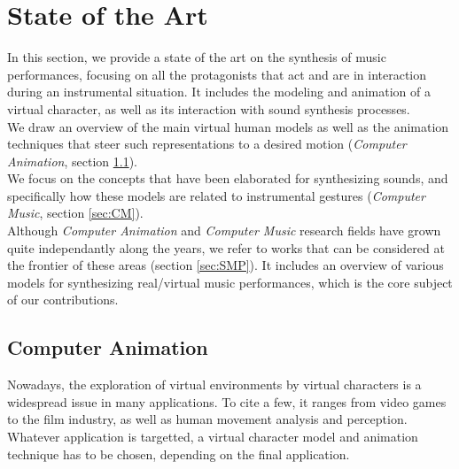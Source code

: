 \chapter{State of the Art}
\label{chapter:StateOfTheArt}



In this section, we provide a state of the art on the synthesis of music performances, focusing on all the protagonists that act and are in interaction during an instrumental situation. It includes the modeling and animation of a virtual character, as well as its interaction with sound synthesis processes.\\

We draw an overview of the main virtual human models as well as the animation techniques that steer such representations to a desired motion (\emph{Computer Animation}, section \ref{sec:CA}).\\

We focus on the concepts that have been elaborated for synthesizing sounds, and specifically how these models are related to instrumental gestures (\emph{Computer Music}, section \ref{sec:CM}).\\

Although \emph{Computer Animation} and \emph{Computer Music} research fields have grown quite independantly along the years, we refer to works that can be considered at the frontier of these areas (section \ref{sec:SMP}). It includes an overview of various models for synthesizing real/virtual music performances, which is the core subject of our contributions.




	\section{Computer Animation}
	\label{sec:CA}

Nowadays, the exploration of virtual environments by virtual characters is a widespread issue in many applications. To cite a few, it ranges from video games to the film industry, as well as human movement analysis and perception. Whatever application is targetted, a virtual character model and animation technique has to be chosen, depending on the final application.\\

